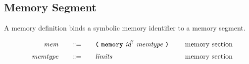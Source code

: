 \subsection{Memory Segment}

A memory definition binds a symbolic memory identifier to a memory segment.

\begin{alignat*}{9}
    && \textit{mem}    &&\quad ::= &\quad && \textbf{\texttt{(}}\ \textbf{\texttt{memory}}\ \textit{id}^?\ \textit{memtype}\ \textbf{\texttt{)}}\ \quad && \textrm{memory section} \\[1mm]
    && \textit{memtype}    &&\quad ::= &\quad && \textit{limits} \quad && \textrm{memory section} \\[1mm]
\end{alignat*}